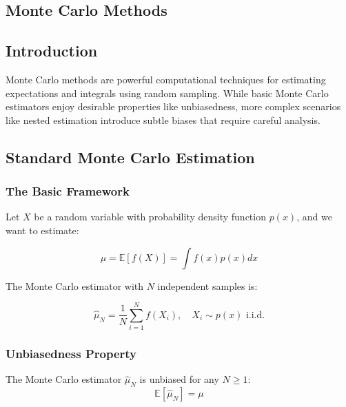 \begin{notechapter}
\chapter{Monte Carlo Methods}\label{ch:monte-carlo}

\section{Introduction}

Monte Carlo methods are powerful computational techniques for estimating expectations and integrals using random sampling. While basic Monte Carlo estimators enjoy desirable properties like unbiasedness, more complex scenarios like nested estimation introduce subtle biases that require careful analysis.

\section{Standard Monte Carlo Estimation}

\subsection{The Basic Framework}

Let $X$ be a random variable with probability density function $p(x)$, and we want to estimate:

\begin{equation}
\mu = \mathbb{E}[f(X)] = \int f(x) p(x) dx
\end{equation}

The Monte Carlo estimator with $N$ independent samples is:

\begin{equation}
\hat{\mu}_N = \frac{1}{N} \sum_{i=1}^N f(X_i), \quad X_i \sim p(x) \text{ i.i.d.}
\end{equation}

\subsection{Unbiasedness Property}

\begin{theorem}
The Monte Carlo estimator $\hat{\mu}_N$ is unbiased for any $N \geq 1$:
\begin{equation}
\mathbb{E}[\hat{\mu}_N] = \mu
\end{equation}
\end{theorem}


\end{notechapter}
